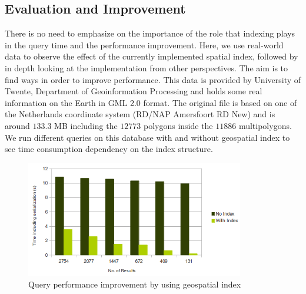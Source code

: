 \documentclass[a4paper,12pt]{article}
\begin{document}
\subsection{Evaluation and Improvement}
\label{BXevaluation}
There is no need to emphasize on the importance of the role that indexing plays in the query time and the performance improvement. Here, we use real-world data to observe the effect of the currently implemented spatial index, followed by in depth looking at the implementation from other perspectives. The aim is to find ways in order to improve performance. This data is provided by University of Twente, Department of Geoinformation Processing and holds some real information on the Earth in GML 2.0 format. The original file is based on one of the Netherlands coordinate system (RD/NAP Amersfoort RD New) and is around $133.3$ MB including the $12773$ polygons inside the $11886$ multipolygons.
We run different queries on this database with and without geospatial index to see time consumption dependency on the index structure. 
\begin{figure}
\centering
\includegraphics[width=0.85\textwidth]{IndexEfficiency}
\caption{Query performance improvement by using geospatial index}
\label{figIndexEfficiency}
\end{figure}
\end{document}
